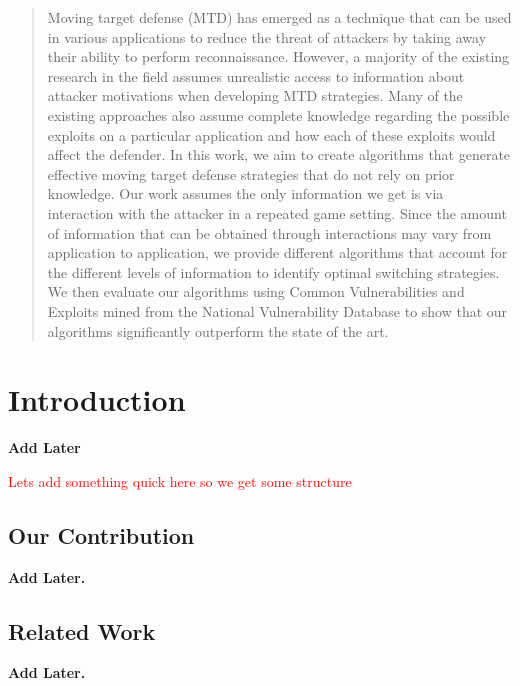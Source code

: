 \documentclass[sigconf]{aamas}  %
\theoremstyle{definition}
\theoremstyle{definition}
\begin{document}
\begin{abstract}  %
Moving target defense (MTD) has emerged as a technique that can be used in various applications to reduce the threat of attackers by taking away their ability to perform reconnaissance. However, a majority of the existing research in the field assumes unrealistic access to information about attacker motivations when developing MTD strategies. Many of the existing approaches also assume complete knowledge regarding the possible exploits on a particular application and how each of these exploits would affect the defender. In this work, we aim to create algorithms that generate effective moving target defense strategies that do not rely on prior knowledge. Our work assumes the only information we get is via interaction with the attacker in a repeated game setting. Since the amount of information that can be obtained through interactions may vary from application to application, we provide different algorithms that account for the different levels of information to identify optimal switching strategies. We then evaluate our algorithms using Common Vulnerabilities and Exploits mined from the National Vulnerability Database to show that our algorithms significantly outperform the state of the art.
\end{abstract}



\maketitle



\section{Introduction}\label{sec:intro}
\textbf{Add Later}

\textcolor{red}{Lets add something quick here so we get some structure}

\subsection{Our Contribution}\label{subsec:contrib}
\textbf{Add Later.}

\subsection{Related Work}\label{subsec:relwork}
\textbf{Add Later.}
\end{document}

